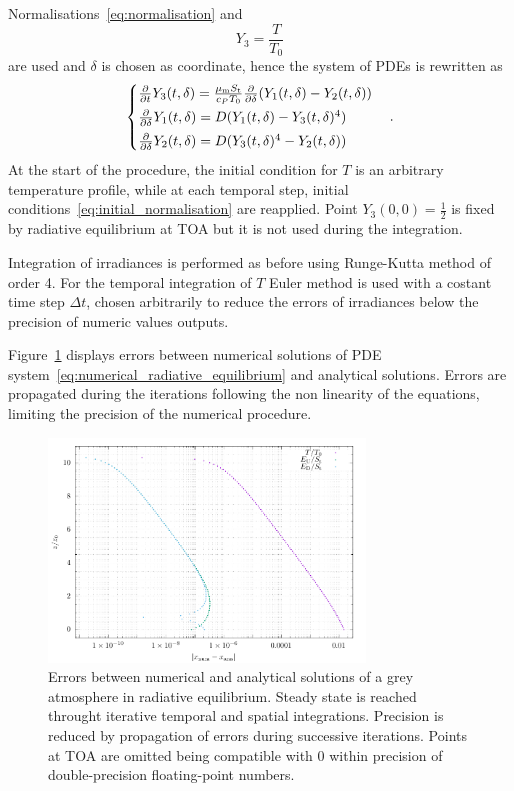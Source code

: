 \documentclass[a4paper,10pt,twocolumn,\classoptions]{article}
\begin{document}
Normalisations~\eqref{eq:normalisation} and
\begin{equation}
  \label{eq:temperature_normalisation}
  Y_3 = \frac{T}{T_0}
\end{equation}
are used and $\delta$ is chosen as coordinate, hence the system of PDEs is rewritten as
\begin{equation}
  \label{eq:numerical_radiative_equilibrium}
  \left\{
  \begin{array}{@{}l@{}}
    \pdv*{Y_3(t, \delta)}{t} = \frac{\mu_\text{m} S_\text{t}}{c_P T_0} \pdv*{(Y_1(t, \delta) - Y_2(t, \delta))}{\delta} \\[0.5em]
    \pdv*{Y_1(t, \delta)}{\delta} = D (Y_1(t, \delta) - Y_3(t, \delta)^4) \\[0.5em]
    \pdv*{Y_2(t, \delta)}{\delta} = D (Y_3(t, \delta)^4 - Y_2(t, \delta))
  \end{array}
  \right.
  \quad .
\end{equation}
At the start of the procedure, the initial condition for $T$ is an arbitrary temperature profile, while at each temporal step, initial conditions~\eqref{eq:initial_normalisation} are reapplied. Point $Y_3(0, 0) = \frac{1}{2}$ is fixed by radiative equilibrium at TOA but it is not used during the integration.

Integration of irradiances is performed as before using Runge-Kutta method of order 4. For the temporal integration of $T$ Euler method is used with a costant time step $\Delta t$, chosen arbitrarily to reduce the errors of irradiances below the precision of numeric values outputs.

Figure~\ref{fig:errors_PDE} displays errors between numerical solutions of PDE system~\eqref{eq:numerical_radiative_equilibrium} and analytical solutions. Errors are propagated during the iterations following the non linearity of the equations, limiting the precision of the numerical procedure.
\begin{figure}[h]
  \centering
  \includegraphics*[keepaspectratio=true,width=0.75\textwidth]{errors_PDE}
  \caption{Errors between numerical and analytical solutions of a grey atmosphere in radiative equilibrium. Steady state is reached throught iterative temporal and spatial integrations. Precision is reduced by propagation of errors during successive iterations. Points at TOA are omitted being compatible with 0 within precision of double-precision floating-point numbers.}
  \label{fig:errors_PDE}
\end{figure}
\end{document}
